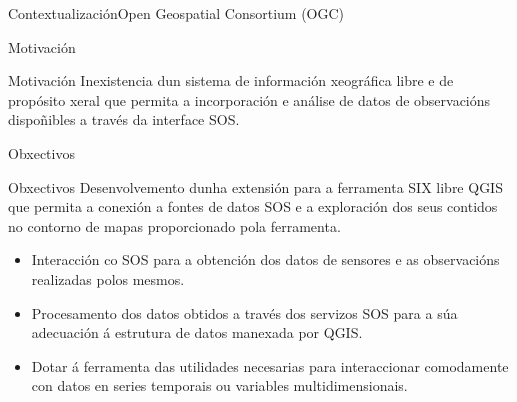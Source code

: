 \documentclass{beamer}
\begin{document}
\begin{frame}{Contextualización}{Open Geospatial Consortium (OGC)}
\end{frame}

\begin{frame}{Motivación}{}
	{\begin{block}{Motivación}
	Inexistencia dun sistema de información xeográfica libre e de propósito xeral que permita a incorporación e análise de datos de observacións dispoñibles a través da interface SOS.\end{block}}
\end{frame}

\begin{frame}{Obxectivos}{}
	{\begin{block}{Obxectivos}
	Desenvolvemento dunha extensión para a ferramenta SIX libre QGIS que permita a conexión a fontes de datos SOS e a exploración dos seus contidos no contorno de mapas proporcionado pola ferramenta.
	\begin{itemize}
	\item<2->Interacción co SOS para a obtención dos datos de sensores e as observacións realizadas polos mesmos.
	\item<3->Procesamento dos datos obtidos a través dos servizos SOS para a súa adecuación á estrutura de datos manexada por QGIS.
	\item<4->Dotar á ferramenta das utilidades necesarias para interaccionar comodamente con datos en series temporais ou variables multidimensionais.
	\end{itemize}
	\end{block}}
\end{frame}
\end{document}
